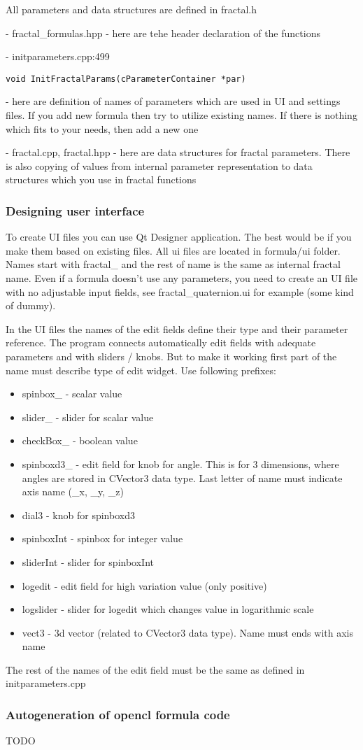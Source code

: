 All parameters and data structures are defined in fractal.h

- fractal\_formulas.hpp - here are tehe header declaration of the functions

- initparameters.cpp:499

\begin{lstlisting}
void InitFractalParams(cParameterContainer *par)
\end{lstlisting}

 - here are definition of names of parameters which are used in UI and settings files. If you add new formula then try to utilize existing names. If there is nothing which fits to your needs, then add a new one

- fractal.cpp, fractal.hpp - here are data structures for fractal parameters. There is also copying of values from internal parameter representation to data structures which you use in fractal functions

\subsubsection{Designing user interface}\label{developers-designing-user-interface}

To create UI files you can use Qt Designer application. The best would be if you make them based on existing files. All ui files are located in formula/ui folder. Names start with fractal\_ and the rest of name is the same as internal fractal name. Even if a formula doesn't use any parameters, you need to create an UI file with no adjustable input fields, see fractal\_quaternion.ui for example (some kind of dummy).

In the UI files the names of the edit fields define their type and their parameter reference. The program connects automatically edit fields with adequate parameters and with sliders / knobs. But to make it working first part of the name must describe type of edit widget. Use following prefixes:
\begin{itemize}
	\item spinbox\_ - scalar value
	\item slider\_ - slider for scalar value
	\item checkBox\_ - boolean value
	\item spinboxd3\_ - edit field for knob for angle. This is for 3 dimensions, 
		where angles are stored in CVector3 data type. Last letter of name must indicate axis name (\_x, \_y, \_z)
	\item dial3 - knob for spinboxd3
	\item spinboxInt - spinbox for integer value
	\item sliderInt - slider for spinboxInt
	\item logedit - edit field for high variation value (only positive)
	\item logslider - slider for logedit which changes value in logarithmic scale
	\item vect3 - 3d vector (related to CVector3 data type). Name must ends with axis name
\end{itemize}

The rest of the names of the edit field must be the same as defined in initparameters.cpp

\subsubsection{Autogeneration of opencl formula code}\label{developers-autogen-opencl-formulas}

TODO
